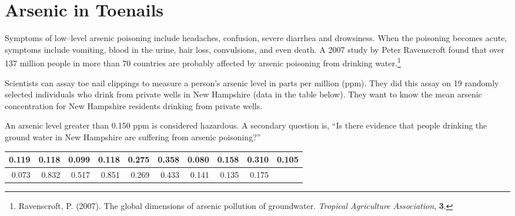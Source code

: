 \def\theTopic{Arsenic}
\def\dayNum{15 }

\section { Arsenic in Toenails}

 Symptoms of low--level  arsenic poisoning
include headaches, confusion, severe diarrhea and
drowsiness.  When the poisoning becomes acute, symptoms include
vomiting, blood in the urine, hair loss, convulsions, and even death.
A 2007 study by Peter Ravenscroft found that over 137 million people
in more than 70 countries are probably affected by arsenic poisoning
from drinking water.\footnote{Ravenscroft, P. (2007). The global
  dimensions of arsenic pollution of groundwater. {\em Tropical
    Agriculture Association}, {\bf 3}.}

Scientists can assay toe nail clippings to measure a person's arsenic
level in parts per million (ppm).  They did this assay on 19 randomly selected 
individuals who drink from private wells in New Hampshire (data in the
table below). They want to know  the mean arsenic 
concentration for New Hampshire residents drinking from private wells.

 An arsenic level greater than 0.150 ppm is considered
hazardous. A secondary question is, ``Is there evidence that people
drinking the ground water in New Hampshire are suffering from arsenic
poisoning?''


\begin{center}
\begin{tabular}{|r|r|r|r|r|r|r|r|r|r|} \hline
0.119& 0.118& 0.099& 0.118& 0.275& 0.358& 0.080& 0.158& 0.310& 0.105
\\ \hline
0.073& 0.832& 0.517& 0.851& 0.269& 0.433& 0.141& 0.135& 0.175 & \\ \hline
\end{tabular}  
\end{center}


